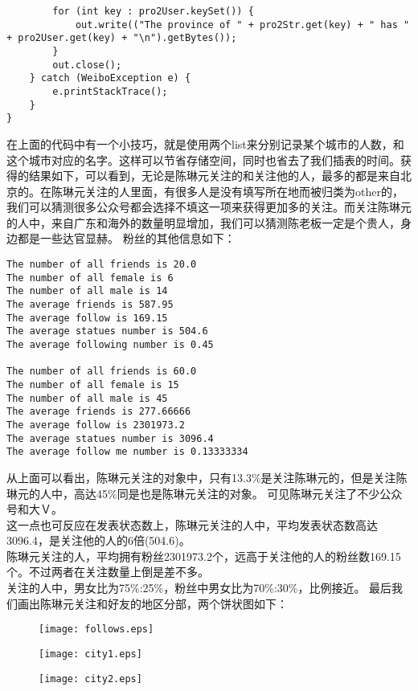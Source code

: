 \documentclass{article}
\begin{document}
\begin{lstlisting}
		for (int key : pro2User.keySet()) {
			out.write(("The province of " + pro2Str.get(key) + " has " + pro2User.get(key) + "\n").getBytes());
		}
		out.close();
	} catch (WeiboException e) {
		e.printStackTrace();
	}
}
\end{lstlisting}
在上面的代码中有一个小技巧，就是使用两个list来分别记录某个城市的人数，和这个城市对应的名字。这样可以节省存储空间，同时也省去了我们插表的时间。获得的结果如下，可以看到，无论是陈琳元关注的和关注他的人，最多的都是来自北京的。在陈琳元关注的人里面，有很多人是没有填写所在地而被归类为other的，我们可以猜测很多公众号都会选择不填这一项来获得更加多的关注。而关注陈琳元的人中，来自广东和海外的数量明显增加，我们可以猜测陈老板一定是个贵人，身边都是一些达官显赫。
粉丝的其他信息如下：
\begin{lstlisting}
The number of all friends is 20.0
The number of all female is 6
The number of all male is 14
The average friends is 587.95
The average follow is 169.15
The average statues number is 504.6
The average following number is 0.45

The number of all friends is 60.0
The number of all female is 15
The number of all male is 45
The average friends is 277.66666
The average follow is 2301973.2
The average statues number is 3096.4
The average follow me number is 0.13333334
\end{lstlisting}
从上面可以看出，陈琳元关注的对象中，只有13.3\%是关注陈琳元的，但是关注陈琳元的人中，高达45\%同是也是陈琳元关注的对象。
可见陈琳元关注了不少公众号和大Ｖ。\\
这一点也可反应在发表状态数上，陈琳元关注的人中，平均发表状态数高达3096.4，是关注他的人的6倍(504.6)。\\
陈琳元关注的人，平均拥有粉丝2301973.2个，远高于关注他的人的粉丝数169.15个。不过两者在关注数量上倒是差不多。\\
关注的人中，男女比为75\%:25\%，粉丝中男女比为70\%:30\%，比例接近。
最后我们画出陈琳元关注和好友的地区分部，两个饼状图如下：
\begin{figure}[t]
\centering
\texttt{[image: follows.eps]}
\end{figure}
\begin{figure}[t]
\centering
\texttt{[image: city1.eps]}
\end{figure}
\begin{figure}[t]
\centering
\texttt{[image: city2.eps]}
\end{figure}
\end{document}
